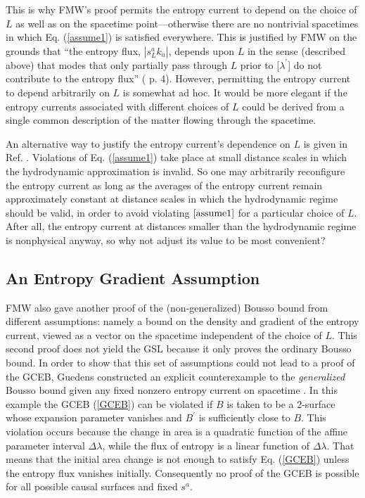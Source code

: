 \documentclass[12pt]{article}
\begin{document}
This is why FMW's proof permits the entropy current to depend on the choice of $L$ as well as on the spacetime point---otherwise there are no nontrivial spacetimes in which Eq. (\ref{assume1}) is satisfied everywhere.  This is justified by FMW on the grounds that ``the entropy flux, $|s^{a}_{L}k_{a}|$, depends upon $L$ in the sense (described above) that modes that only partially pass through $L$ prior to [$\lambda^\prime$] do not contribute to the entropy flux'' (\cite{FMW00} p. 4).  However, permitting the entropy current to depend arbitrarily on $L$ is somewhat ad hoc.  It would be more elegant if the entropy currents associated with different choices of $L$ could be derived from a single common description of the matter flowing through the spacetime.

An alternative way to justify the entropy current's dependence on $L$ is given in Ref. \cite{BFM03}.  Violations of Eq. (\ref{assume1}) take place at small distance scales in which the hydrodynamic approximation is invalid.  So one may arbitrarily reconfigure the entropy current as long as the averages of the entropy current remain approximately constant at distance scales in which the hydrodynamic regime should be valid, in order to avoid violating $\ref{assume1}$ for a particular choice of $L$.  After all, the entropy current at distances smaller than the hydrodynamic regime is nonphysical anyway, so why not adjust its value to be most convenient?

\subsection{An Entropy Gradient Assumption}\label{BFM}

FMW also gave another proof of the (non-generalized) Bousso bound from different assumptions: namely a bound on the density and gradient of the entropy current, viewed as a vector on the spacetime independent of the choice of $L$.  This second proof does not yield the GSL because it only proves the ordinary Bousso bound.  In order to show that this set of assumptions could not lead to a proof of the GCEB, Guedens constructed an explicit counterexample to the \emph{generalized} Bousso bound given any fixed nonzero entropy current on spacetime \cite{guedens}.  In this example the GCEB (\ref{GCEB}) can be violated if $B$ is taken to be a 2-surface whose expansion parameter vanishes and $B^\prime$ is sufficiently close to $B$.  This violation occurs because the change in area is a quadratic function of the affine parameter interval $\Delta \lambda$, while the flux of entropy is a linear function of $\Delta \lambda$.  That means that the initial area change is not enough to satisfy Eq. (\ref{GCEB}) unless the entropy flux vanishes initially.  Consequently no proof of the GCEB is possible for all possible causal surfaces and fixed $s^a$.
\end{document}
